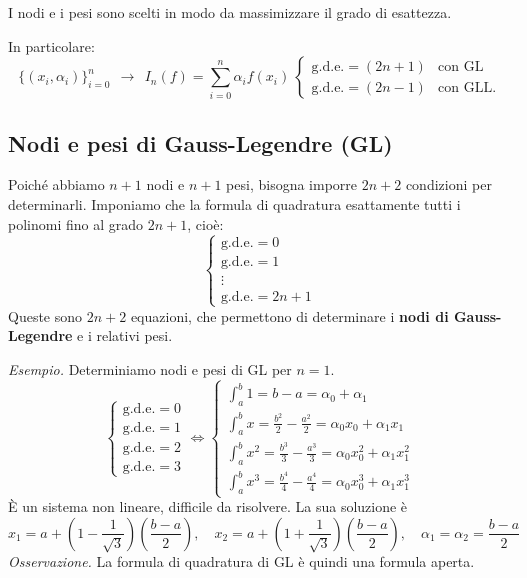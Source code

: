 I nodi e i pesi sono scelti in modo da massimizzare il grado di esattezza.

In particolare:
\begin{equation*}
\{( x_{i} ,\alpha _{i})\}^{n}_{i=0} \ \ \rightarrow \ \ I_{n}(f) =\sum\limits ^{n}_{i=0} \alpha _{i} f( x_{i}) \ \begin{cases}
\text{g.d.e.} =( 2n+1) & \text{con GL}\\
\text{g.d.e.} =( 2n-1) & \text{con GLL.}
\end{cases}
\end{equation*}

\subsection{Nodi e pesi di Gauss-Legendre (GL)}
Poiché abbiamo $n+1$ nodi e $n+1$ pesi, bisogna imporre $2n+2$ condizioni per determinarli. Imponiamo che la formula di quadratura esattamente tutti i polinomi fino al grado $2n+1$, cioè:
\[
\begin{cases}
    \text{g.d.e.}=0\\
    \text{g.d.e.}=1\\
    \vdots\\
    \text{g.d.e.}=2n+1
\end{cases}
\]
Queste sono $2n+2$ equazioni, che permettono di determinare i \textbf{nodi di Gauss-Legendre} e i relativi pesi.

\textit{Esempio.} Determiniamo nodi e pesi di GL per $n=1$.
\[
\begin{cases}
    \text{g.d.e.}=0\\
    \text{g.d.e.}=1\\
    \text{g.d.e.}=2\\
    \text{g.d.e.}=3
\end{cases}\iff 
\begin{cases}
    \int_a^b 1=b-a=\alpha_0+\alpha_1\\
    \int_a^b x=\frac{b^2}2-\frac{a^2}2=\alpha_0 x_0+\alpha_1 x_1\\
    \int_a^b x^2=\frac{b^3}3-\frac{a^3}3=\alpha_0 x_0^2+\alpha_1 x_1^2\\
    \int_a^b x^3=\frac{b^4}4-\frac{a^4}4=\alpha_0 x_0^3+\alpha_1 x_1^3
\end{cases}
\]
È un sistema non lineare, difficile da risolvere. La sua soluzione è 
\[
x_1= a+\left(1-\frac1{\sqrt 3}\right)\left(\frac{b-a}2\right),\quad x_2= a+\left(1+\frac1{\sqrt 3}\right)\left(\frac{b-a}2\right),\quad \alpha_1=\alpha_2 =\frac{b-a}{2}
\]
\textit{Osservazione.} La formula di quadratura di GL è quindi una formula aperta.

